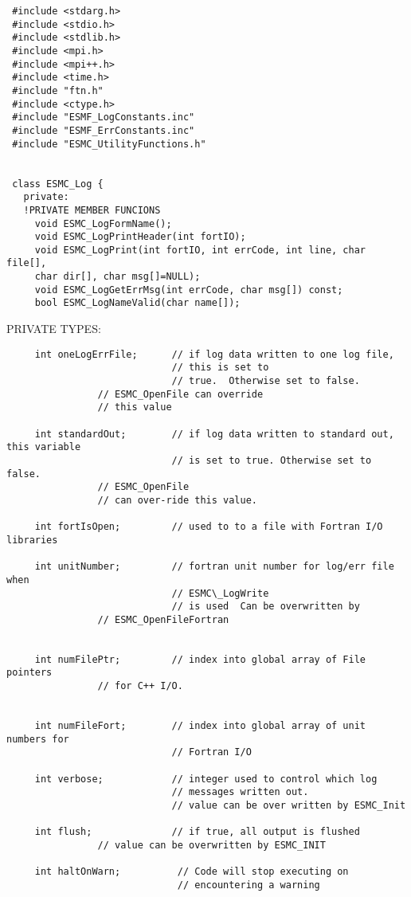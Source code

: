 \begin{verbatim} #include <stdarg.h>
 #include <stdio.h>
 #include <stdlib.h>
 #include <mpi.h>
 #include <mpi++.h>
 #include <time.h>
 #include "ftn.h"
 #include <ctype.h>
 #include "ESMF_LogConstants.inc"
 #include "ESMF_ErrConstants.inc"
 #include "ESMC_UtilityFunctions.h"
 
 
 class ESMC_Log {
   private:
   !PRIVATE MEMBER FUNCIONS
     void ESMC_LogFormName();
     void ESMC_LogPrintHeader(int fortIO);
     void ESMC_LogPrint(int fortIO, int errCode, int line, char file[],
     char dir[], char msg[]=NULL);
     void ESMC_LogGetErrMsg(int errCode, char msg[]) const;
     bool ESMC_LogNameValid(char name[]);\end{verbatim}{\sf PRIVATE TYPES:}
\begin{verbatim} 
     int oneLogErrFile;      // if log data written to one log file,
                             // this is set to
                             // true.  Otherwise set to false.
 			    // ESMC_OpenFile can override
 			    // this value
 
     int standardOut;        // if log data written to standard out, this variable
                             // is set to true. Otherwise set to false.
 			    // ESMC_OpenFile
 			    // can over-ride this value.
 
     int fortIsOpen;         // used to to a file with Fortran I/O libraries 
     
     int unitNumber;         // fortran unit number for log/err file when
                             // ESMC\_LogWrite
                             // is used  Can be overwritten by
 			    // ESMC_OpenFileFortran
 
 
     int numFilePtr;         // index into global array of File pointers
 			    // for C++ I/O.
 
 
     int numFileFort;        // index into global array of unit numbers for 
                             // Fortran I/O
 
     int verbose;            // integer used to control which log
                             // messages written out.
                             // value can be over written by ESMC_Init
 
     int flush;              // if true, all output is flushed
 			    // value can be overwritten by ESMC_INIT
 
     int haltOnWarn;          // Code will stop executing on
                              // encountering a warning
 			    

\end{verbatim}
